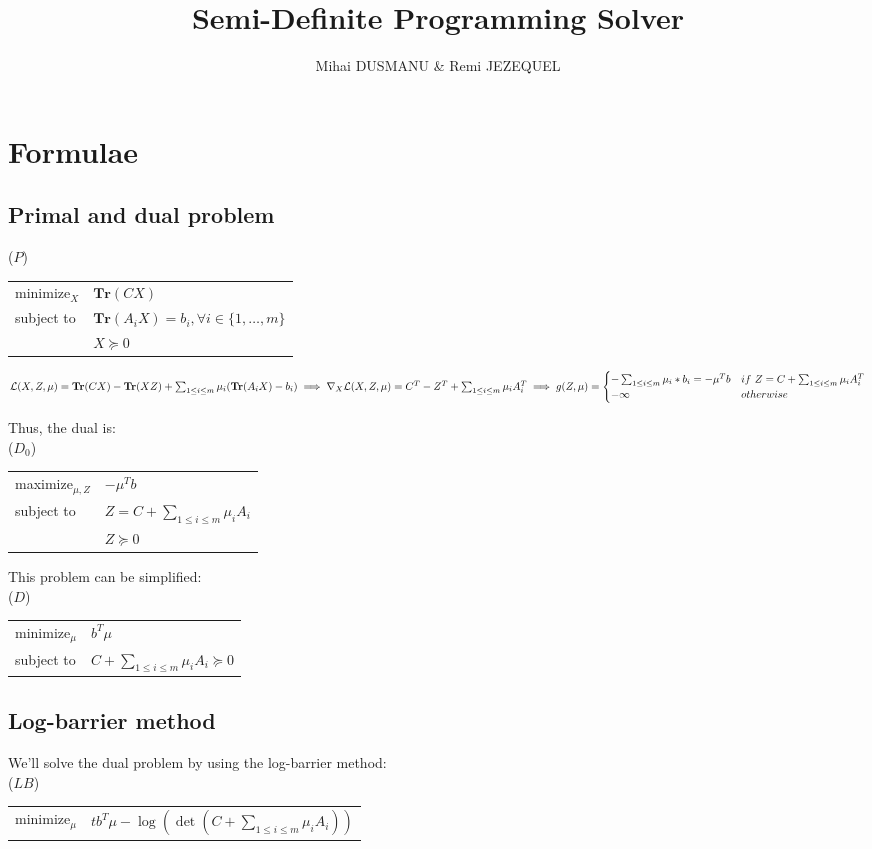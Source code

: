 \documentclass{article}
\title{Semi-Definite Programming Solver}
\author{Mihai DUSMANU \& Remi JEZEQUEL}
\begin{document}
	
\maketitle

\section{Formulae}

\subsection{Primal and dual problem}

($P$)\begin{tabular}{l l}
	minimize$_{X}$ & $\mathbf{Tr}(C X)$ \\
	subject to & $\mathbf{Tr}(A_i X) = b_i, \forall i \in \{1, \dots, m\}$ \\
	& $X \succeq 0$  
\end{tabular}

$\mathcal{L}(X, Z, \mu) = \mathbf{Tr}(C X) - \mathbf{Tr}(X Z) + \sum_{1 \leq i \leq m} \mu_i (\mathbf{Tr}(A_i X) - b_i) \\
\implies \nabla_X \mathcal{L}(X, Z, \mu) = C^T - Z^T + \sum_{1 \leq i \leq m} \mu_i A_i^T \\
\implies g(Z, \mu) = \begin{cases}
- \sum_{1 \leq i \leq m} \mu_i * b_i = - \mu^T b & if\ Z = C + \sum_{1 \leq i \leq m} \mu_i A_i^T \\ 
- \infty & otherwise 
\end{cases}$

Thus, the dual is: \\
($D_0$)\begin{tabular}{l l}
	maximize$_{\mu, Z}$ & $- \mu^T b$ \\
	subject to & $Z = C + \sum_{1 \leq i \leq m} \mu_i A_i$ \\
	& $Z \succeq 0$
\end{tabular}

This problem can be simplified: \\
($D$)\begin{tabular}{l l}
	minimize$_{\mu}$ & $b^T \mu$ \\
	subject to & $C + \sum_{1 \leq i \leq m} \mu_i A_i \succeq 0$
\end{tabular}

\subsection{Log-barrier method}
We'll solve the dual problem by using the log-barrier method: \\
($LB$)\begin{tabular}{l l}
	minimize$_{\mu}$ & $t b^T \mu - \log(\det(C + \sum_{1 \leq i \leq m} \mu_i A_i))$
\end{tabular}
\end{document}
